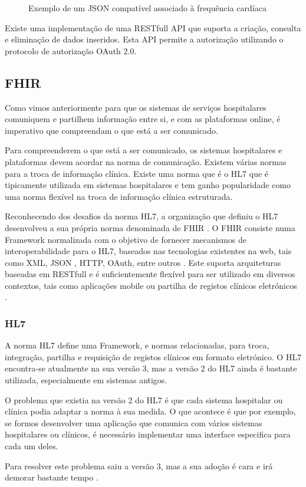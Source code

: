 \documentclass[11pt,twoside,a4paper]{report}
\begin{document}
\begin{figure}[H]
\inputminted{json}{code/heart-rate.json}
\caption[Exemplo de um \gls{JSON} compatível associado à frequência cardíaca]{Exemplo de um \gls{JSON} compatível associado à frequência cardíaca \cite{omhheartrate}}
\label{f:exemplo}
\end{figure}


Existe uma implementação de uma \gls{REST}full \gls{API} que suporta a criação, consulta e eliminação de dados inseridos. Esta \gls{API} permite a autorização utilizando o protocolo de autorização OAuth 2.0.

\subsection{FHIR}

Como vimos anteriormente para que os sistemas de serviços hospitalares comuniquem e partilhem  informação entre si, e com as plataformas online, é imperativo que compreendam o que está a ser comunicado.
\par 
Para compreenderem o que está a ser comunicado, os sistemas hospitalares e plataformas devem acordar na norma de comunicação. Existem várias normas para a troca de informação clínica. Existe uma norma que é o \gls{HL7} que é tipicamente utilizada em sistemas hospitalares \cite{whyihe} e tem ganho popularidade como uma norma flexível na troca de informação clínica estruturada.


Reconhecendo dos desafios da norma \gls{HL7}, a organização que definiu o \gls{HL7} desenvolveu a sua própria norma denominada de \gls{FHIR} \cite{hl7fhir}. O \gls{FHIR} consiste numa Framework normalizada com o objetivo de fornecer mecanismos de interoperabilidade para o \gls{HL7}, baseados nas tecnologias existentes na web, tais como \gls{XML}, \gls{JSON} , \gls{HTTP}, OAuth, entre outros \cite{hl7fhir}. Este suporta arquiteturas baseadas em \gls{REST}full e é suficientemente flexível para ser utilizado em diversos contextos, tais como aplicações mobile ou partilha de registos clínicos eletrónicos \cite{hl7fhir}.


\subsubsection{HL7}

A norma HL7 define uma Framework, e normas relacionadas, para troca, integração, partilha e requisição de  registos clínicos em formato eletrónico\cite{hl7}.
O HL7 encontra-se atualmente na sua versão 3\cite{corepointhealth}, mas a versão 2 do \gls{HL7} ainda é bastante utilizada, especialmente em sistemas antigos. 
\par
O problema que existia na versão 2 do \gls{HL7} é que cada sistema hospitalar ou clínica podia adaptar a norma à sua medida. O que acontece é que por exemplo, se formos desenvolver uma aplicação que comunica com vários  sistemas hospitalares ou clínicos, é necessário implementar uma interface especifica para cada um deles.
\par
Para resolver este problema saiu a versão 3, mas a sua adoção é cara e irá demorar bastante tempo \cite{corepointhealth}.
\end{document}
